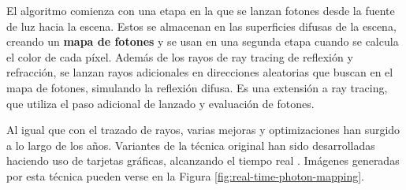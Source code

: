 El algoritmo comienza con una etapa en la que se lanzan fotones desde la fuente de luz hacia la escena.
Estos se almacenan en las superficies difusas de la escena, creando un \textbf{mapa de fotones} y se usan en una segunda etapa cuando se calcula el color de cada píxel.
Además de los rayos de ray tracing de reflexión y refracción, se lanzan rayos adicionales en direcciones aleatorias que buscan en el mapa de fotones, simulando la reflexión difusa.
Es una extensión a ray tracing, que utiliza el paso adicional de lanzado y evaluación de fotones.

Al igual que con el trazado de rayos, varias mejoras y optimizaciones han surgido a lo largo de los años.
Variantes de la técnica original han sido desarrolladas haciendo uso de tarjetas gráficas, alcanzando el tiempo real \cite{real-time-photon-mapping}.
Imágenes generadas por esta técnica pueden verse en la Figura \ref{fig:real-time-photon-mapping}.

